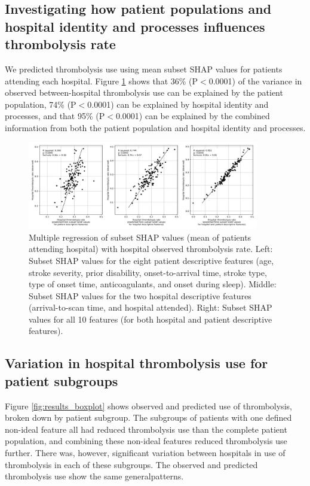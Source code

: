 \subsection{Investigating how patient populations and hospital identity and processes influences thrombolysis rate}

We predicted thrombolysis use using mean subset SHAP values for patients attending each hospital. Figure \ref{fig:shap_multiple_regression} shows that 36\% (P$<$0.0001) of the variance in observed between-hospital thrombolysis use can be explained by the patient population, 74\% (P$<$0.0001) can be explained by hospital identity and processes, and that 95\% (P$<$0.0001) can be explained by the combined information from both the patient population and hospital identity and processes. 

\begin{figure}[!h]
    \centering
    \includegraphics[width=0.9\textwidth]{./images/03f_xgb_10_features_multiple_regression_patient_hospital}
    \caption{Multiple regression of subset SHAP values (mean of patients attending hospital) with hospital observed thrombolysis rate. Left: Subset SHAP values for the eight patient descriptive features (age, stroke severity, prior disability, onset-to-arrival time, stroke type, type of onset time, anticoagulants, and onset during sleep). Middle: Subset SHAP values for the two hospital descriptive features (arrival-to-scan time, and hospital attended). Right: Subset SHAP values for all 10 features (for both hospital and patient descriptive features).}
  \label{fig:shap_multiple_regression}
\end{figure}

\subsection{Variation in hospital thrombolysis use for patient subgroups}

Figure \ref{fig:results_boxplot} shows observed and predicted use of thrombolysis, broken down by patient subgroup. The subgroups of patients with one defined non-ideal feature all had reduced thrombolysis use than the complete patient population, and combining these non-ideal features reduced thrombolysis use further. There was, however, significant variation between hospitals in use of thrombolysis in each of these subgroups. The observed and predicted thrombolysis use show the same generalpatterns.

